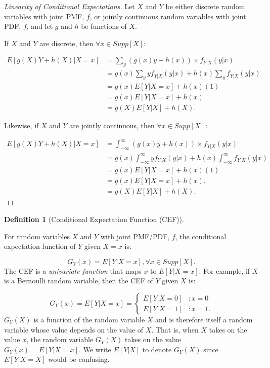 \documentclass[
]{article}
\theoremstyle{definition}
\newtheorem{definition}{Definition}[section]
\theoremstyle{definition}
\theoremstyle{definition}
\theoremstyle{remark}
\begin{document}
\begin{proof}[Linearity of Conditional Expectations]

Let \(X\) and \(Y\) be either discrete random variables with joint PMF, \(f\), or jointly continuous random variables with joint PDF, \(f\), and let \(g\) and \(h\) be functions of \(X\).

If \(X\) and \(Y\) are discrete, then \(\forall x \in Supp[X]\):

\begin{align}
E[g(X)Y+h(X) | X=x] &= \sum_y (g(x)y + h(x)) \times f_{Y|X}(y|x) \\
                    &= g(x) \sum_y yf_{Y|X}(y|x) + h(x) \sum_y f_{Y|X}(y|x) \\
                    &= g(x)E[Y | X=x] + h(x)(1) \\
                    &= g(x)E[Y | X=x] + h(x) \\
                    &= g(X)E[Y|X] + h(X).
\end{align}

Likewise, if \(X\) and \(Y\) are jointly continuous, then \(\forall x \in Supp[X]\):

\begin{align}
E[g(X)Y+h(X) | X=x] &= \int_{-\infty}^{\infty} (g(x)y + h(x)) \times f_{Y|X}(y|x) \\
                    &= g(x) \int_{-\infty}^{\infty} yf_{Y|X}(y|x) + h(x) \int_{-\infty}^{\infty} f_{Y|X}(y|x) \\
                    &= g(x)E[Y | X=x] + h(x)(1) \\
                    &= g(x)E[Y | X=x] + h(x). \\
                    &= g(X)E[Y|X] + h(X).
\end{align}

\end{proof}

\begin{definition}[Conditional Expectation Function (CEF)]
\protect\hypertarget{def:unlabeled-div-94}{}\label{def:unlabeled-div-94}

For random variables \(X\) and \(Y\) with joint PMF/PDF, \(f\), the conditional expectation function of \(Y\) given \(X=x\) is:

\[G_Y(x) = E[Y | X=x], \forall x \in Supp[X].\]
The CEF is a \emph{univariate function} that maps \(x\) to \(E[Y | X=x]\). For example, if \(X\) is a Bernoulli random variable, then the CEF of \(Y\) given \(X\) is:

\[G_Y(x) = E[Y | X=x] = \begin{cases} E[Y | X=0] &: x=0 \\ E[Y |X=1] &: x=1. \end{cases}\]
\(G_Y(X)\) is a function of the random variable \(X\) and is therefore itself a random variable whose value depends on the value of \(X\). That is, when \(X\) takes on the value \(x\), the random variable \(G_Y(X)\) takes on the value \(G_Y(x) = E[Y | X=x].\) We write \(E[Y|X]\) to denote \(G_Y(X)\) since \(E[Y | X=X]\) would be confusing.

\end{definition}
\end{document}
